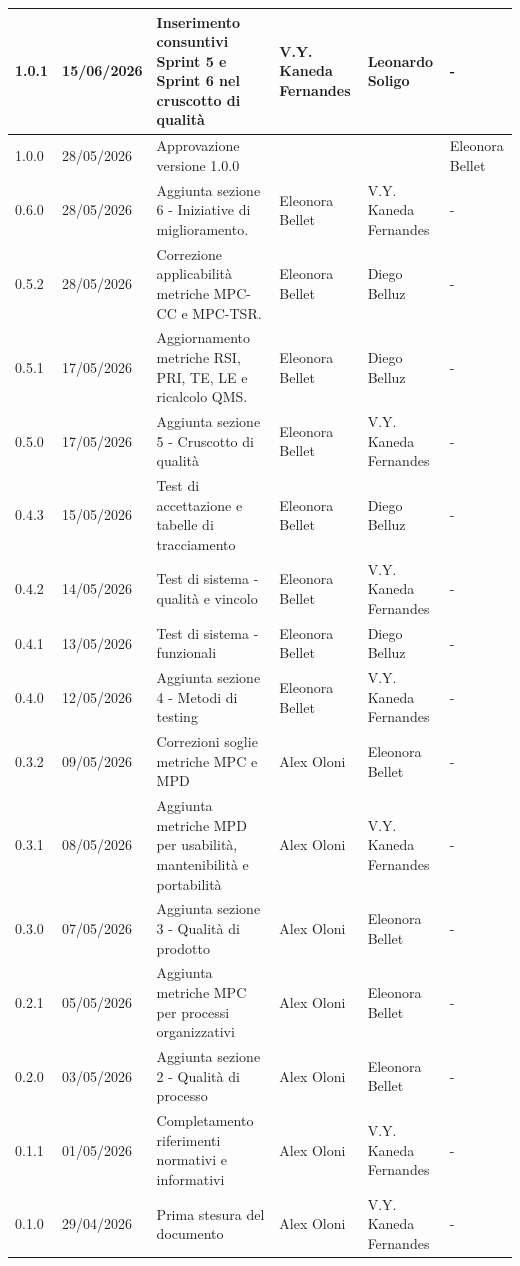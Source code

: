 \documentclass[a4paper,12pt]{article}
\begin{document}
\begin{center}
{\begin{longtable}{|p{1.4cm}|p{1.8cm}|p{5cm}|p{2.4cm}|p{2.3cm}|p{2.3cm}|}
        \hline
        1.0.1 & 15/06/2026 & Inserimento consuntivi Sprint 5 e Sprint 6 nel cruscotto di qualità & V.Y. Kaneda Fernandes & Leonardo Soligo & - \\
        \hline
        1.0.0 & 28/05/2026 & Approvazione versione 1.0.0 &  &  & Eleonora Bellet \\
        \hline
        0.6.0 & 28/05/2026 & Aggiunta sezione 6 - Iniziative di miglioramento. & Eleonora Bellet & V.Y. Kaneda Fernandes & - \\
        \hline
        0.5.2 & 28/05/2026 & Correzione applicabilità metriche MPC-CC e MPC-TSR. & Eleonora Bellet & Diego Belluz & - \\
        \hline
        0.5.1 & 17/05/2026 & Aggiornamento metriche RSI, PRI, TE, LE e ricalcolo QMS. & Eleonora Bellet & Diego Belluz & - \\
        \hline
        0.5.0 & 17/05/2026 & Aggiunta sezione 5 - Cruscotto di qualità & Eleonora Bellet & V.Y. Kaneda Fernandes & - \\
        \hline
        0.4.3 & 15/05/2026 & Test di accettazione e tabelle di tracciamento & Eleonora Bellet & Diego Belluz & - \\
        \hline
        0.4.2 & 14/05/2026 & Test di sistema - qualità e vincolo & Eleonora Bellet &  V.Y. Kaneda Fernandes & - \\
        \hline
        0.4.1 & 13/05/2026 & Test di sistema - funzionali & Eleonora Bellet & Diego Belluz & - \\
        \hline
        0.4.0 & 12/05/2026 & Aggiunta sezione 4 - Metodi di testing & Eleonora Bellet & V.Y. Kaneda Fernandes & - \\
        \hline
        0.3.2 & 09/05/2026 & Correzioni soglie metriche MPC e MPD & Alex Oloni & Eleonora Bellet & - \\
        \hline
        0.3.1 & 08/05/2026 & Aggiunta metriche MPD per usabilità, mantenibilità e portabilità & Alex Oloni & V.Y. Kaneda Fernandes & - \\
        \hline
        0.3.0 & 07/05/2026 & Aggiunta sezione 3 - Qualità di prodotto & Alex Oloni & Eleonora Bellet & - \\
        \hline
        0.2.1 & 05/05/2026 & Aggiunta metriche MPC per processi organizzativi & Alex Oloni & Eleonora Bellet & - \\
        \hline
        0.2.0 & 03/05/2026 & Aggiunta sezione 2 - Qualità di processo & Alex Oloni & Eleonora Bellet & - \\
        \hline
        0.1.1 & 01/05/2026 & Completamento riferimenti normativi e informativi & Alex Oloni & V.Y. Kaneda Fernandes & - \\
        \hline
        0.1.0 & 29/04/2026 & Prima stesura del documento & Alex Oloni & V.Y. Kaneda Fernandes & - \\
        \hline
    \end{longtable}
    }
\end{center}
\newpage
\end{document}
